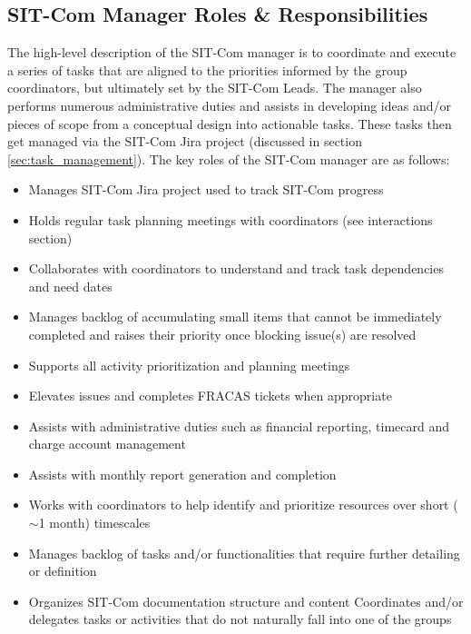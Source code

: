\documentclass[SE,lsstdraft,authoryear,toc]{lsstdoc}
\begin{document}
\subsection{SIT-Com Manager Roles \& Responsibilities}
\label{sec:manager_r_and_rs}
The high-level description of the SIT-Com manager is to coordinate and execute a series of tasks that are aligned to the priorities informed by the group coordinators, but ultimately set by the SIT-Com Leads.
The manager also performs numerous administrative duties and assists in developing ideas and/or pieces of scope from a conceptual design into actionable tasks.
These tasks then get managed via the SIT-Com Jira project (discussed in section \ref{sec:task_management}). The key roles of the SIT-Com manager are as follows:
\begin{itemize}
    \item Manages SIT-Com Jira project used to track SIT-Com progress
    \item Holds regular task planning meetings with coordinators (see interactions section)
    \item Collaborates with coordinators to understand and track task dependencies and need dates
    \item Manages backlog of accumulating small items that cannot be immediately completed and raises their priority once blocking issue(s) are resolved
    \item Supports all activity prioritization and planning meetings
    \item Elevates issues and completes FRACAS tickets when appropriate
    \item Assists with administrative duties such as financial reporting, timecard and charge account management
    \item Assists with monthly report generation and completion
    \item Works with coordinators to help identify and prioritize resources over short ($\sim$1 month) timescales
    \item Manages backlog of tasks and/or functionalities that require further detailing or definition
    \item Organizes SIT-Com documentation structure and content
Coordinates and/or delegates tasks or activities that do not naturally fall into one of the groups
\end{itemize}
\end{document}
